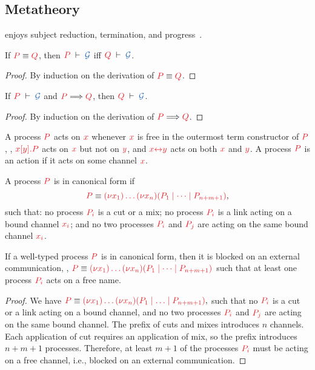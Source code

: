 \documentclass[envcountsame,UKenglish]{llncs}
\begin{document}
\subsection{Metatheory}
\label{sec:hcp-metatheory}
\hcp enjoys subject reduction, termination, and progress~\cite{kokke2018tlla}.
\begin{lemma}\label{lem:hcp-preservation-equiv}
  If $\tm{P}\equiv\tm{Q}$, then $\seq[P]{\mathcal{G}}$ iff $\seq[Q]{\mathcal{G}}$.
\end{lemma} 
\begin{proof}
  By induction on the derivation of $\tm{P}\equiv\tm{Q}$.
\end{proof}
\begin{theorem}[Preservation]\label{thm:hcp-preservation}
  If $\seq[P]{\mathcal{G}}$ and $\reducesto{P}{Q}$, then $\seq[Q]{\mathcal{G}}$.
\end{theorem} 
\begin{proof}
  By induction on the derivation of $\reducesto{P}{Q}$.
\end{proof}
\begin{definition}[Actions]
  A process $\tm{P}$ acts on $\tm{x}$ whenever $\tm{x}$ is free in the outermost
  term constructor of $\tm{P}$, \eg, $\tm{\piSend{x}{y}{P}}$ acts on $\tm{x}$
  but not on $\tm{y}$, and $\tm{\cpLink{x}{y}}$ acts on both $\tm{x}$ and $\tm{y}$.
  A process $\tm{P}$ is an action if it acts on some channel $\tm{x}$.
\end{definition}
\begin{definition}\label{def:hcp-canonical-forms}
  A process $\tm{P}$ is in canonical form if
  \[
  \tm{P} \equiv \tm{\piNew{x_1}{\dots\piNew{x_n}{(P_1 \mid \dots \mid P_{n+m+1})}}},
  \]
  such that: no process $\tm{P_i}$ is a cut or a mix; no process $\tm{P_i}$ is a link acting on a bound channel $\tm{x_i}$; and no two processes $\tm{P_i}$ and $\tm{P_j}$ are acting on the same bound channel $\tm{x_i}$.
\end{definition}
\begin{lemma}
  If a well-typed process $\tm{P}$ is in canonical form, then it is blocked on
  an external communication, \ie,
  $\tm{P}\equiv\tm{\piNew{x_1}{\dots\piNew{x_n}{(P_1\mid\dots\mid P_{n+m+1})}}}$
  such that at least one process $\tm{P_i}$ acts on a free name.
\end{lemma}
\begin{proof}
  We have
  \(
  \tm{P} \equiv \tm{\piNew{x_1}{\dots\piNew{x_n}{(P_1 \ppar \dots \ppar P_{n+m+1})}}},
  \)
  such that no $\tm{P_i}$ is a cut or a link acting on a bound channel, and no two processes $\tm{P_i}$ and $\tm{P_j}$ are acting on the same bound channel. The prefix of cuts and mixes introduces $n$ channels. Each application of cut requires an application of mix, so the prefix introduces $n+m+1$ processes. Therefore, at least $m+1$ of the processes $\tm{P_i}$ must be acting on a free channel, i.e., blocked on an external communication.
\end{proof}
\end{document}
